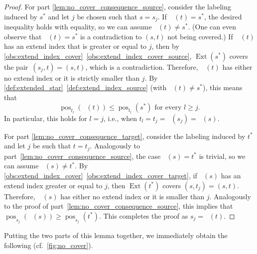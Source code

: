 \documentclass[11pt, letterpaper]{article}
\DeclareMathOperator{\pos}{pos}
\DeclareMathOperator{\minmat}{N_{\mathrm{min}}}
\DeclareMathOperator{\maxmat}{N_{\mathrm{max}}}
\DeclareMathOperator{\ext}{Ext}
\theoremstyle{definition}
\theoremstyle{plain}
\begin{document}
\begin{proof}
For part \ref{lem:no_cover_consequence_source}, consider the labeling induced by $s^*$ and let $j$ be chosen such that $s=s_j$.
If~$\maxmat(t)=s^*$, the desired inequality holds with equality, so we can assume $\maxmat(t)\neq s^*$. (One can even observe that $\maxmat(t)=s^*$ is a contradiction to $(s,t)$ not being covered.)
If~$\maxmat(t)$ has an extend index that is greater or equal to $j$,  then by \cref{obs:extend_index_cover}~\ref{obs:extend_index_cover_source}, $\ext(s^*)$ covers the pair~$(s_j,t)=(s,t)$, which is a contradiction.
Therefore,~$\maxmat(t)$ has either no extend index or it is strictly smaller than $j$. 
By \cref{def:extended_star}~\ref{def:extend_index_source} (with $\maxmat(t)\neq s^*$), this means that
\begin{equation*}
\pos_{t_l}(\maxmat(t))\leq \pos_{t_l}(s^*) \text{ for every  $l\geq j$}.
\end{equation*}
In particular, this holds for $l=j$, i.e., when $t_l=t_j=\minmat(s_j)=\minmat(s)$.

For part \ref{lem:no_cover_consequence_target}, consider the labeling induced by $t^*$ and let $j$ be such that $t=t_j$. 
Analogously to part~\ref{lem:no_cover_consequence_source}, the case $\minmat(s)=t^*$ is trivial, so we can assume $\minmat(s)\neq t^*$.
By \cref{obs:extend_index_cover}~\ref{obs:extend_index_cover_target}, if $\minmat(s)$ has an extend index greater or equal to $j$, then  $\ext(t^*)$ covers $(s,t_j)=(s,t)$. Therefore,~$\minmat(s)$ has either no extend index or it is smaller than $j$. 
Analogously to the proof of part~\ref{lem:no_cover_consequence_source}, this implies that $\pos_{s_j}(\minmat(s)) \geq \pos_{s_j}(t^*)$. This completes the proof as $s_j=\maxmat(t)$.
\end{proof}

Putting the two parts of this lemma together, we immediately obtain the following (cf.~\cref{fig:no_cover}).
\end{document}
